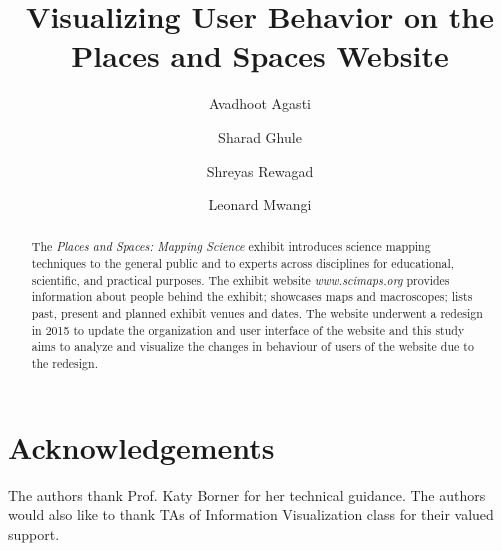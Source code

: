 \documentclass[sigconf]{acmart}
\begin{document}
\title{Visualizing User Behavior on the Places and Spaces Website}

\author{Avadhoot Agasti}

\author{Sharad Ghule}

\author{Shreyas Rewagad}

\author{Leonard Mwangi}


\begin{abstract}

The \textit{Places and Spaces: Mapping Science} exhibit introduces science mapping techniques to the general public and to experts across disciplines for educational, scientific, and practical purposes. The exhibit website \textit{www.scimaps.org} provides information about people behind the exhibit; showcases maps and macroscopes; lists past, present and planned exhibit venues and dates. The website underwent a redesign in 2015 to update the organization and user interface of the website and this study aims to analyze and visualize the changes in behaviour of users of the website due to the redesign. 
\end{abstract}



\maketitle



















\section{Acknowledgements}
 The authors thank Prof. Katy Borner for her technical guidance. The
 authors would also like to thank TAs of Information Visualization class for their valued
 support.



 
\end{document}
